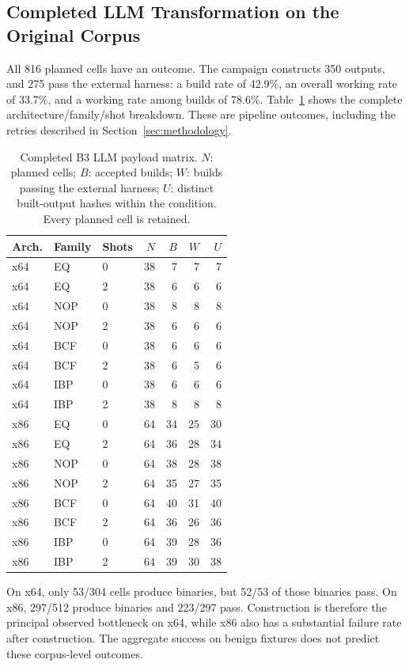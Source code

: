 \subsection{Completed LLM Transformation on the Original Corpus}
All 816 planned cells have an outcome. The campaign constructs 350
outputs, and 275 pass the external harness: a build rate of 42.9\%, an
overall working rate of 33.7\%, and a working rate among builds of 78.6\%.
Table~\ref{tab:payload_llm} shows the complete architecture/family/shot
breakdown. These are pipeline outcomes, including the retries described
in Section~\ref{sec:methodology}.


\begin{table}[t]
\caption{Completed B3 LLM payload matrix. $N$: planned cells; $B$: accepted
builds; $W$: builds passing the external harness; $U$: distinct built-output
hashes within the condition. Every planned cell is retained.}
\label{tab:payload_llm}
\centering\small
\begin{tabular}{@{}lllrrrr@{}}
\toprule
Arch. & Family & Shots & $N$ & $B$ & $W$ & $U$ \\
\midrule
x64 & EQ & 0 & 38 & 7 & 7 & 7 \\
x64 & EQ & 2 & 38 & 6 & 6 & 6 \\
x64 & NOP & 0 & 38 & 8 & 8 & 8 \\
x64 & NOP & 2 & 38 & 6 & 6 & 6 \\
x64 & BCF & 0 & 38 & 6 & 6 & 6 \\
x64 & BCF & 2 & 38 & 6 & 5 & 6 \\
x64 & IBP & 0 & 38 & 6 & 6 & 6 \\
x64 & IBP & 2 & 38 & 8 & 8 & 8 \\
\midrule
x86 & EQ & 0 & 64 & 34 & 25 & 30 \\
x86 & EQ & 2 & 64 & 36 & 28 & 34 \\
x86 & NOP & 0 & 64 & 38 & 28 & 38 \\
x86 & NOP & 2 & 64 & 35 & 27 & 35 \\
x86 & BCF & 0 & 64 & 40 & 31 & 40 \\
x86 & BCF & 2 & 64 & 36 & 26 & 36 \\
x86 & IBP & 0 & 64 & 39 & 28 & 36 \\
x86 & IBP & 2 & 64 & 39 & 30 & 38 \\
\bottomrule
\end{tabular}
\end{table}



On x64, only 53/304 cells produce binaries, but 52/53 of those binaries
pass. On x86, 297/512 produce binaries and 223/297 pass. Construction is
therefore the principal observed bottleneck on x64, while x86 also has a
substantial failure rate after construction. The aggregate success on
benign fixtures does not predict these corpus-level outcomes.

